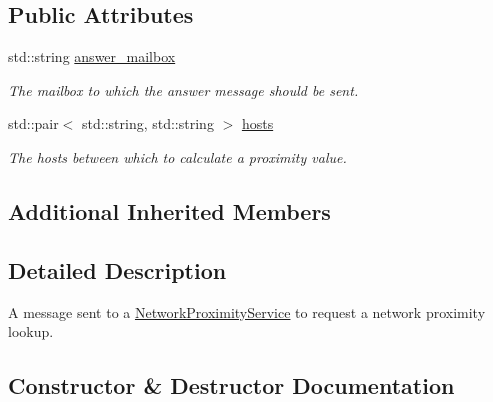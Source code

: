 \subsection*{Public Attributes}
\begin{DoxyCompactItemize}
\item 
\mbox{\label{classwrench_1_1_network_proximity_lookup_request_message_aba90de7e971b92a2c26f45f2f4792705}} 
std\+::string \hyperlink{classwrench_1_1_network_proximity_lookup_request_message_aba90de7e971b92a2c26f45f2f4792705}{answer\+\_\+mailbox}
\begin{DoxyCompactList}\small\item\em The mailbox to which the answer message should be sent. \end{DoxyCompactList}\item 
\mbox{\label{classwrench_1_1_network_proximity_lookup_request_message_af220802502401663de010c2ca46fb88d}} 
std\+::pair$<$ std\+::string, std\+::string $>$ \hyperlink{classwrench_1_1_network_proximity_lookup_request_message_af220802502401663de010c2ca46fb88d}{hosts}
\begin{DoxyCompactList}\small\item\em The hosts between which to calculate a proximity value. \end{DoxyCompactList}\end{DoxyCompactItemize}
\subsection*{Additional Inherited Members}


\subsection{Detailed Description}
A message sent to a \hyperlink{classwrench_1_1_network_proximity_service}{Network\+Proximity\+Service} to request a network proximity lookup. 

\subsection{Constructor \& Destructor Documentation}
\mbox{\label{classwrench_1_1_network_proximity_lookup_request_message_a04e078d44b0e8bd4cd7f59916baaca82}} 
